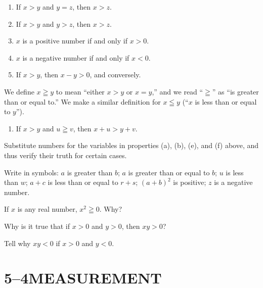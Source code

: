 \documentclass[11pt]{book}
\begin{document}
\begin{enumerate}[label=(\alph*), leftmargin=2.2em, itemsep=1pt, topsep=3pt]
\item If $x > y$ and $y = z$, then $x > z$.
\item If $x > y$ and $y > z$, then $x > z$.
\item $x$ is a positive number if and only if $x > 0$.
\item $x$ is a negative number if and only if $x < 0$.
\item If $x > y$, then $x - y > 0$, and conversely.
\end{enumerate}

\medskip
We define $x \geqq y$ to mean ``either $x > y$ or $x = y$,'' and we read
``$\geqq$'' as ``is greater than or equal to.'' We make a similar definition
for $x \leqq y$ (``$x$ is less than or equal to $y$'').

\begin{enumerate}[label=(\alph*), leftmargin=2.2em, itemsep=1pt, topsep=3pt,
                  start=6]
\item If $x > y$ and $u \geqq v$, then $x + u > y + v$.
\end{enumerate}


\begin{exercisecols}
\begin{exlist}
\item Substitute numbers for the variables in properties (a), (b), (e), and (f)
      above, and thus verify their truth for certain cases.
\item Write in symbols: $a$ is greater than $b$; $a$ is greater than or equal
      to $b$; $u$ is less than $w$; $a + c$ is less than or equal to $r + s$;
      $(a + b)^2$ is positive; $z$ is a negative number.
\item If $x$ is any real number, $x^2 \geqq 0$. Why?
\item Why is it true that if $x > 0$ and $y > 0$, then $xy > 0$?
\item Tell why $xy < 0$ if $x > 0$ and $y < 0$.
\end{exlist}
\end{exercisecols}

\section*{5--4\quad MEASUREMENT}
\end{document}
